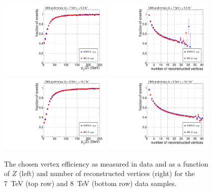 \begin{figure}
  \includegraphics[width=0.48\textwidth]{ch3_comm_anal_comps/plots/vertex_bdt_efficiency_pt_7TeV.pdf}
  \includegraphics[width=0.48\textwidth]{ch3_comm_anal_comps/plots/vertex_bdt_efficiency_nvtx_7TeV.pdf} \\
  \includegraphics[width=0.48\textwidth]{ch3_comm_anal_comps/plots/vertex_bdt_efficiency_pt_8TeV.pdf}
  \includegraphics[width=0.48\textwidth]{ch3_comm_anal_comps/plots/vertex_bdt_efficiency_nvtx_8TeV.pdf} 
  \caption{The chosen vertex efficiency as measured in \Zmumu data and \MC as a function of $Z$ \pT (left) and number of reconstructed vertices (right) for the 7~TeV (top row) and 8~TeV (bottom row) data samples.}
  \label{fig:vertex_bdt_efficiency}
\end{figure}

